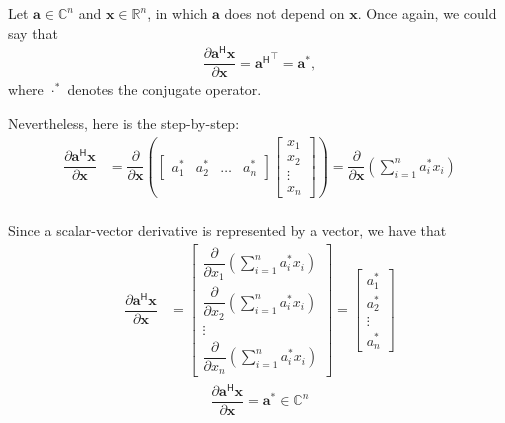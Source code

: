 \documentclass{article}
\newcommand{\trans}{\top}
\newcommand{\hermit}{\mathsf{H}}
\begin{document}
Let \(\mathbf{a} \in \mathbb{C}^{n}\) and \(\mathbf{x}\in \mathbb{R}^{n}\), in which \(\mathbf{a}\) does not depend on \(\mathbf{x}\). Once again, we could say that
\begin{align}
    \dfrac{\partial \mathbf{a}^\hermit \mathbf{x}}{\partial \mathbf{x}} = {\mathbf{a}^\hermit}^\trans = \mathbf{a}^*,
\end{align}
where \(\cdot^*\) denotes the conjugate operator.

Nevertheless, here is the step-by-step:
\begin{align}
    \dfrac{\partial \mathbf{a}^\hermit \mathbf{x}}{\partial \mathbf{x}} &= \dfrac{\partial}{\partial \mathbf{x}} \left(
    \begin{bmatrix}
        a^*_1 & a^*_2 & \dots & a^*_n
    \end{bmatrix} \begin{bmatrix}
        x_{1} \\ x_{2} \\ \vdots \\ x_{n}
    \end{bmatrix} \right) 
    = \dfrac{\partial}{\partial \mathbf{x}} \left( \sum_{i = 1}^n a^*_ix_i \right) \\
\end{align}

Since a scalar-vector derivative is represented by a vector, we have that
\begin{align}
    \dfrac{\partial \mathbf{a}^\hermit \mathbf{x}}{\partial \mathbf{x}} &= \begin{bmatrix}
        \dfrac{\partial}{\partial x_1} \left( \sum_{i = 1}^n a^*_ix_i \right) \\ \dfrac{\partial}{\partial x_2} \left( \sum_{i = 1}^n a^*_ix_i \right) \\ \vdots \\ \dfrac{\partial}{\partial x_n} \left( \sum_{i = 1}^n a^*_ix_i \right) 
    \end{bmatrix}
    = \begin{bmatrix}
        a^*_1 \\ a^*_2 \\ \vdots \\ a^*_n
    \end{bmatrix}
\end{align}
\begin{align}
    \boxed{\dfrac{\partial \mathbf{a}^\hermit \mathbf{x}}{\partial \mathbf{x}} = \mathbf{a}^* \in \mathbb{C}^{n}}
\end{align}
\end{document}
